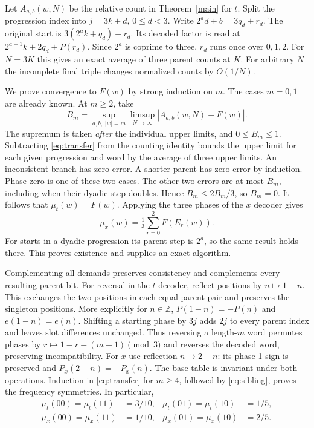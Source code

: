 \documentclass[11pt]{article}
\begin{document}
Let $A_{a,b}(w,N)$ be the relative count in Theorem~\ref{main} for $t$. Split the
progression index into $j=3k+d$, $0\le d<3$. Write $2^a d+b=3q_d+r_d$. The original
start is $3(2^ak+q_d)+r_d$. Its decoded factor is read at
$2^{a+1}k+2q_d+P(r_d)$. Since $2^a$ is coprime to three, $r_d$ runs once over $0,1,2$.
For $N=3K$ this gives an exact average of three parent counts at $K$.
For arbitrary $N$ the incomplete final triple changes normalized counts by $O(1/N)$.

We prove convergence to $F(w)$ by strong induction on $m$. The cases $m=0,1$ are already
known. At $m\ge2$, take
\[
 B_m=\sup_{a,b,\;|w|=m}\limsup_{N\to\infty}|A_{a,b}(w,N)-F(w)|.
\]
The supremum is taken \emph{after} the individual upper limits, and $0\le B_m\le1$.
Subtracting \eqref{eq:transfer} from the counting identity bounds the upper limit for
each given progression and word by the average of three upper limits. An inconsistent
branch has zero error. A shorter parent has zero error by induction. Phase zero is one
of these two cases. The other two errors are at most $B_m$, including when their dyadic
step doubles. Hence $B_m\le2B_m/3$, so $B_m=0$. It follows that $\mu_t(w)=F(w)$.
Applying the three phases of the $x$ decoder gives
\begin{equation}
                 \mu_x(w)=\tfrac13\sum_{r=0}^2 F(E_r(w)).\label{eq:sibling}
\end{equation}
For starts in a dyadic progression its parent step is $2^a$, so the same result holds
there. This proves existence and supplies an exact algorithm.

Complementing all demands preserves consistency and complements every resulting parent bit.
For reversal in the $t$ decoder, reflect positions by $n\mapsto1-n$. This exchanges
the two positions in each equal-parent pair and preserves the singleton positions. More
explicitly for $n\in\mathbb Z$,
$P(1-n)=-P(n)$ and $e(1-n)=e(n)$. Shifting a starting phase by $3j$ adds $2j$ to every
parent index and leaves slot differences unchanged. Thus reversing a length-$m$ word
permutes phases by $r\mapsto1-r-(m-1)\pmod3$ and reverses the decoded word, preserving
incompatibility. For $x$ use reflection $n\mapsto2-n$: its phase-1 sign is preserved and
$P_x(2-n)=-P_x(n)$. The base table is invariant under both operations. Induction in
\eqref{eq:transfer} for $m\ge4$, followed by \eqref{eq:sibling}, proves the frequency
symmetries. In particular,
\[
 \begin{aligned}\mu_t(00)=\mu_t(11)&=3/10, & \mu_t(01)=\mu_t(10)&=1/5,\\
 \mu_x(00)=\mu_x(11)&=1/10, & \mu_x(01)=\mu_x(10)&=2/5.\end{aligned}
\]
\end{document}

